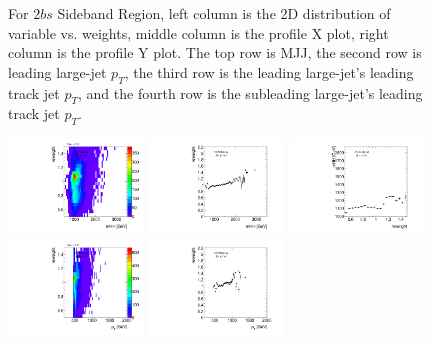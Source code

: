 \begin{figure}[htbp!]
\begin{center}
\caption{For $2bs$ Sideband Region, left column is the 2D distribution of variable vs. weights, middle column is the profile X plot, right column is the profile Y plot. The top row is MJJ, the second row is leading large-\R jet $p_{T}$, the third row is the leading large-\R jet's leading track jet $p_{T}$, and the fourth row is the subleading large-\R jet's leading track jet $p_{T}$.}
\label{fig:app-reweight-dist-2b-SB}
\end{center}
\end{figure}


\begin{figure}[htbp!]
\begin{center}
\includegraphics[width=0.32\textwidth,angle=-90]{figures/boosted/AppendixReweight/Weights/3Trk_Sideband_mHH_l_weight.pdf}
\includegraphics[width=0.32\textwidth,angle=-90]{figures/boosted/AppendixReweight/Weights/3Trk_Sideband_mHH_l_weight_profx.pdf}
\includegraphics[width=0.32\textwidth,angle=-90]{figures/boosted/AppendixReweight/Weights/3Trk_Sideband_mHH_l_weight_profy.pdf}\\
\includegraphics[width=0.32\textwidth,angle=-90]{figures/boosted/AppendixReweight/Weights/3Trk_Sideband_leadHCand_Pt_m_weight.pdf}
\includegraphics[width=0.32\textwidth,angle=-90]{figures/boosted/AppendixReweight/Weights/3Trk_Sideband_leadHCand_Pt_m_weight_profx.pdf}

\end{center}
\end{figure}
